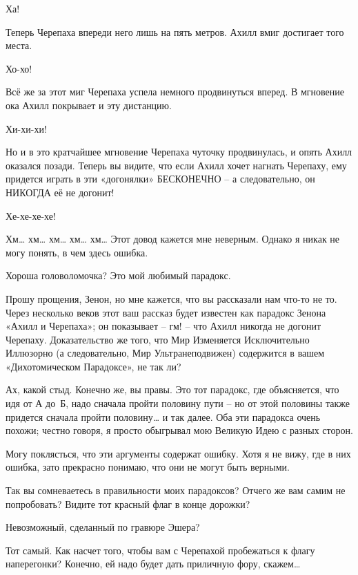 \documentclass[../main.tex]{subfiles}
\begin{document}
\begin{dialogue}
 Ха!

 Теперь Черепаха впереди него лишь на пять метров. Ахилл вмиг достигает того места.

 Хо-хо!

 Всё же за этот миг Черепаха успела немного продвинуться вперед. В мгновение ока Ахилл покрывает и эту дистанцию.

 Хи-хи-хи!

 Но и в это кратчайшее мгновение Черепаха чуточку продвинулась, и опять Ахилл оказался позади. Теперь вы видите, что если Ахилл хочет нагнать Черепаху, ему придется играть в эти «догонялки» БЕСКОНЕЧНО \--- а следовательно, он НИКОГДА её не догонит!

 Хе-хе-хе-хе!

 Хм\ldots{} хм\ldots{} хм\ldots{} хм\ldots{} хм\ldots{} Этот довод кажется мне неверным. Однако я никак не могу понять, в чем здесь ошибка.

 Хороша головоломочка? Это мой любимый парадокс.

 Прошу прощения, Зенон, но мне кажется, что вы рассказали нам что-то не то. Через несколько веков этот ваш рассказ будет известен как парадокс Зенона «Ахилл и Черепаха»; он показывает \--- гм! \--- что Ахилл никогда не догонит Черепаху. Доказательство же того, что Мир Изменяется Исключительно Иллюзорно (а следовательно, Мир Ультранеподвижен) содержится в вашем «Дихотомическом Парадоксе», не так ли?

 Ах, какой стыд. Конечно же, вы правы. Это тот парадокс, где объясняется, что идя от А до~Б, надо сначала пройти половину пути \--- но от этой половины также придется сначала пройти половину\ldots{} и так далее. Оба эти парадокса очень похожи; честно говоря, я просто обыгрывал мою Великую Идею с разных сторон.

 Могу поклясться, что эти аргументы содержат ошибку. Хотя я не вижу, где в них ошибка, зато прекрасно понимаю, что они не могут быть верными.

 Так вы сомневаетесь в правильности моих парадоксов? Отчего же вам самим не попробовать? Видите тот красный флаг в конце дорожки?

 Невозможный, сделанный по гравюре Эшера?

 Тот самый. Как насчет того, чтобы вам с Черепахой пробежаться к флагу наперегонки? Конечно, ей надо будет дать приличную фору, скажем\ldots{}


\end{dialogue}
\end{document}
